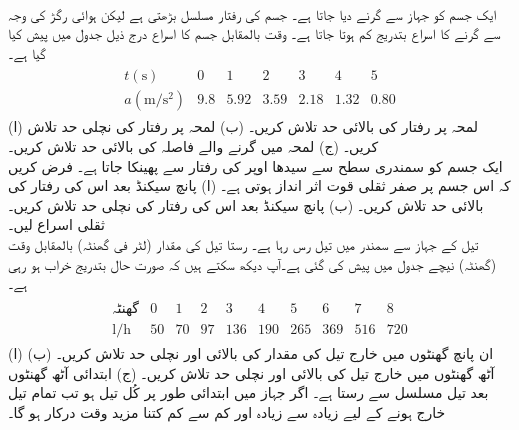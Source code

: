 \\
ایک جسم کو جہاز سے گرنے دیا جاتا ہے۔ جسم کی رفتار مسلسل بڑھتی ہے لیکن ہوائی رگڑ کی وجہ سے گرنے کا اسراع بتدریج کم ہوتا جاتا ہے۔ وقت بالمقابل جسم کا اسراع  درج ذیل جدول میں پیش کیا گیا ہے۔
\begin{align*}
\begin{array}{c|cccccc}
t(\si{\second})&0&1&2&3&4&5\\
\hline
a(\si{\meter\per\second\squared})&9.8&5.92&3.59&2.18&1.32&0.80
\end{array}
\end{align*} 
(ا) لمحہ  پر رفتار کی بالائی حد تلاش کریں۔ (ب) لمحہ  پر رفتار کی نچلی حد تلاش کریں۔ (ج) لمحہ  میں گرنے والے فاصلہ کی بالائی حد تلاش کریں۔\\ 
ایک جسم کو سمندری سطح سے سیدھا اوپر  کی رفتار سے  پھینکا جاتا ہے۔ فرض کریں کہ اس جسم پر صفر ثقلی قوت اثر انداز ہوتی ہے۔ (ا) پانچ سیکنڈ بعد اس کی رفتار کی بالائی حد تلاش کریں۔ (ب) پانچ سیکنڈ بعد اس کی رفتار کی نچلی حد تلاش کریں۔ ثقلی اسراع   لیں۔
\\
تیل کے جہاز سے سمندر میں تیل رس رہا ہے۔ رستا تیل کی مقدار (لٹر فی گھنٹہ) بالمقابل وقت (گھنٹہ)  نیچے جدول میں  پیش کی  گئی ہے۔آپ دیکھ سکتے ہیں کہ صورت حال بتدریج خراب ہو رہی ہے۔
\begin{align*}
\begin{array}{c|ccccccccc}
\text{گھنٹہ}&0&1&2&3&4&5&6&7&8\\
\hline
\si{\litre\per\hour}&50&70&97&136&190&265&369&516&720
\end{array}
\end{align*} 
(ا) ان پانچ گھنٹوں میں خارج تیل کی مقدار کی بالائی اور نچلی حد تلاش کریں۔ (ب) آٹھ گھنٹوں میں خارج تیل کی بالائی اور نچلی حد تلاش  کریں۔ (ج) ابتدائی آٹھ گھنٹوں بعد تیل مسلسل  سے رستا ہے۔ اگر جہاز میں ابتدائی طور  پر کُل  تیل ہو تب تمام تیل خارج ہونے کے لیے زیادہ سے زیادہ اور کم سے کم  کتنا مزید  وقت درکار ہو گا۔ \\
